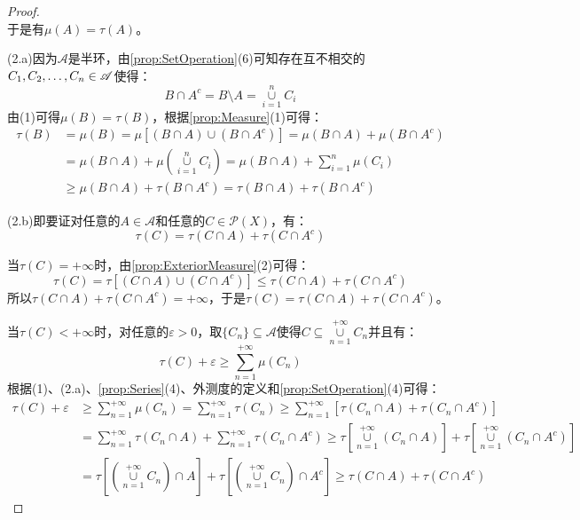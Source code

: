 \begin{proof}
\begin{equation*}
	\end{equation*}
	于是有$\mu(A)=\tau(A)$。\par
	(2.a)因为$\mathscr{A}$是半环，由\cref{prop:SetOperation}(6)可知存在互不相交的$C_1, C_2, \dots, C_{n}\in\mathscr{A}$使得：
	\begin{equation*}
		B\cap A^c=B\setminus A=\underset{i=1}{\overset{n}{\cup}}C_i
	\end{equation*}
	由(1)可得$\mu(B)=\tau(B)$，根据\cref{prop:Measure}(1)可得：
	\begin{align*}
		\tau(B)&=\mu(B)=\mu[(B\cap A)\cup (B\cap A^c)]=\mu(B\cap A)+\mu(B\cap A^c) \\
		&=\mu(B\cap A)+\mu\left(\underset{i=1}{\overset{n}{\cup}}C_i\right)=\mu(B\cap A)+\sum_{i=1}^{n}\mu(C_i) \\
		&\geqslant\mu(B\cap A)+\tau(B\cap A^c)=\tau(B\cap A)+\tau(B\cap A^c)
	\end{align*}\par
	(2.b)即要证对任意的$A\in\mathscr{A}$和任意的$C\in\mathscr{P}(X)$，有：
	\begin{equation*}
		\tau(C)=\tau(C\cap A)+\tau(C\cap A^c)
	\end{equation*}\par
	当$\tau(C)=+\infty$时，由\cref{prop:ExteriorMeasure}(2)可得：
	\begin{equation*}
		\tau(C)=\tau[(C\cap A)\cup(C\cap A^c)]\leqslant\tau(C\cap A)+\tau(C\cap A^c)
	\end{equation*}
	所以$\tau(C\cap A)+\tau(C\cap A^c)=+\infty$，于是$\tau(C)=\tau(C\cap A)+\tau(C\cap A^c)$。\par
	当$\tau(C)<+\infty$时，对任意的$\varepsilon>0$，取$\{C_n\}\subseteq\mathscr{A}$使得$C\subseteq\underset{n=1}{\overset{+\infty}{\cup}}C_n$并且有：
	\begin{equation*}
		\tau(C)+\varepsilon\geqslant\sum_{n=1}^{+\infty}\mu(C_n)
	\end{equation*}
	根据(1)、(2.a)、\cref{prop:Series}(4)、外测度的定义和\cref{prop:SetOperation}(4)可得：
	\begin{align*}
		\tau(C)+\varepsilon&\geqslant\sum_{n=1}^{+\infty}\mu(C_n)=\sum_{n=1}^{+\infty}\tau(C_n)\geqslant\sum_{n=1}^{+\infty}[\tau(C_n\cap A)+\tau(C_n\cap A^c)] \\
		&=\sum_{n=1}^{+\infty}\tau(C_n\cap A)+\sum_{n=1}^{+\infty}\tau(C_n\cap A^c)\geqslant\tau\left[\underset{n=1}{\overset{+\infty}{\cup}}(C_n\cap A)\right]+\tau\left[\underset{n=1}{\overset{+\infty}{\cup}}(C_n\cap A^c)\right] \\
		&=\tau\left[\left(\underset{n=1}{\overset{+\infty}{\cup}}C_n\right)\cap A\right]+\tau\left[\left(\underset{n=1}{\overset{+\infty}{\cup}}C_n\right)\cap A^c\right]\geqslant\tau(C\cap A)+\tau(C\cap A^c)

\end{align*}
\end{proof}
